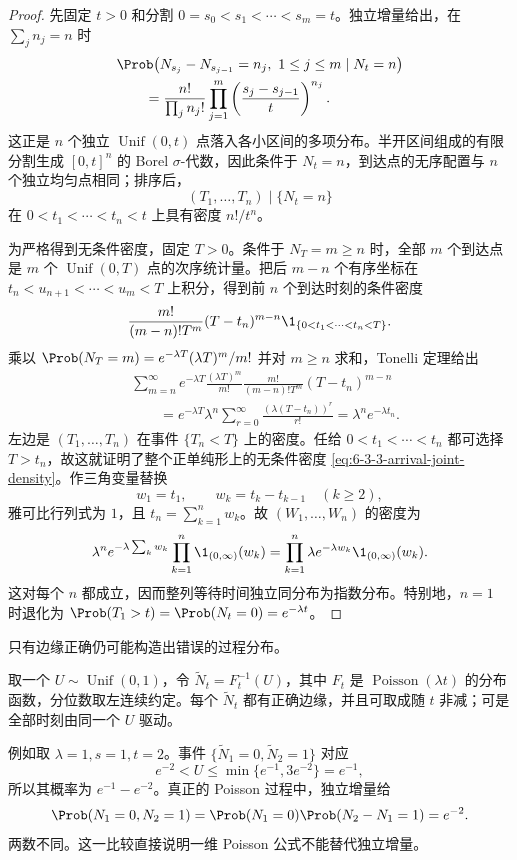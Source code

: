 \begin{proof}
先固定 $t>0$ 和分割 $0=s_0<s_1<\cdots<s_m=t$。独立增量给出，在
$\sum_jn_j=n$ 时
\begin{align*}
 &\Prob\bigl(N_{s_j}-N_{s_{j-1}}=n_j,\ 1\leq j\leq m\mid N_t=n\bigr)\\
 &\qquad=
 \frac{n!}{\prod_jn_j!}\prod_{j=1}^m
 \left(\frac{s_j-s_{j-1}}{t}\right)^{n_j}.
\end{align*}
这正是 $n$ 个独立 $\operatorname{Unif}(0,t)$ 点落入各小区间的多项分布。半开区间组成的有限
分割生成 $[0,t]^n$ 的 Borel $\sigma$-代数，因此条件于 $N_t=n$，到达点的无序配置与
$n$ 个独立均匀点相同；排序后，
\[
 (T_1,\ldots,T_n)\mid\{N_t=n\}
\]
在 $0<t_1<\cdots<t_n<t$ 上具有密度 $n!/t^n$。

为严格得到无条件密度，固定 $T>0$。条件于 $N_T=m\ge n$ 时，全部 $m$ 个到达点是 $m$ 个
$\operatorname{Unif}(0,T)$ 点的次序统计量。把后 $m-n$ 个有序坐标在
$t_n<u_{n+1}<\cdots<u_m<T$ 上积分，得到前 $n$ 个到达时刻的条件密度
\[
 \frac{m!}{(m-n)!T^m}(T-t_n)^{m-n}
 \1_{\{0<t_1<\cdots<t_n<T\}}.
\]
乘以 $\Prob(N_T=m)=e^{-\lambda T}(\lambda T)^m/m!$ 并对 $m\ge n$ 求和，Tonelli 定理给出
\begin{align*}
 &\sum_{m=n}^\infty
 e^{-\lambda T}\frac{(\lambda T)^m}{m!}
 \frac{m!}{(m-n)!T^m}(T-t_n)^{m-n}\\
 &\qquad=e^{-\lambda T}\lambda^n
 \sum_{r=0}^\infty\frac{(\lambda(T-t_n))^r}{r!}
 =\lambda^ne^{-\lambda t_n}.
\end{align*}
左边是 $(T_1,\ldots,T_n)$ 在事件 $\{T_n<T\}$ 上的密度。任给
$0<t_1<\cdots<t_n$ 都可选择 $T>t_n$，故这就证明了整个正单纯形上的无条件密度
\eqref{eq:6-3-3-arrival-joint-density}。作三角变量替换
\[
 w_1=t_1,\qquad w_k=t_k-t_{k-1}\quad(k\geq2),
\]
雅可比行列式为 $1$，且 $t_n=\sum_{k=1}^nw_k$。故 $(W_1,\ldots,W_n)$ 的密度为
\[
 \lambda^ne^{-\lambda\sum_kw_k}\prod_{k=1}^n\1_{(0,\infty)}(w_k)
 =\prod_{k=1}^n\lambda e^{-\lambda w_k}\1_{(0,\infty)}(w_k).
\]
这对每个 $n$ 都成立，因而整列等待时间独立同分布为指数分布。特别地，$n=1$ 时退化为
$\Prob(T_1>t)=\Prob(N_t=0)=e^{-\lambda t}$。
\end{proof}

只有边缘正确仍可能构造出错误的过程分布。

\begin{example}\label{ex:6-3-3-4}
取一个 $U\sim\operatorname{Unif}(0,1)$，令 $\widetilde N_t=F_t^{-1}(U)$，其中 $F_t$ 是
$\operatorname{Poisson}(\lambda t)$ 的分布函数，分位数取左连续约定。每个
$\widetilde N_t$ 都有正确边缘，并且可取成随 $t$ 非减；可是全部时刻由同一个 $U$ 驱动。

例如取 $\lambda=1,s=1,t=2$。事件
$\{\widetilde N_1=0,\widetilde N_2=1\}$ 对应
\[
 e^{-2}<U\leq\min\{e^{-1},3e^{-2}\}=e^{-1},
\]
所以其概率为 $e^{-1}-e^{-2}$。真正的 Poisson 过程中，独立增量给
\[
 \Prob(N_1=0,N_2=1)=\Prob(N_1=0)\Prob(N_2-N_1=1)=e^{-2}.
\]
两数不同。这一比较直接说明一维 Poisson 公式不能替代独立增量。
\end{example}

